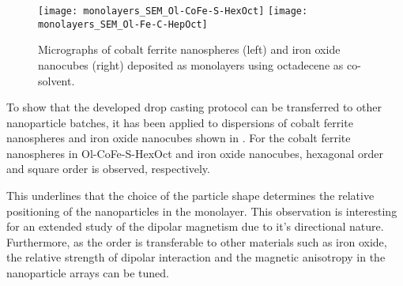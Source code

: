 \documentclass[\main/dresen_thesis.tex]{subfiles}
\begin{document}
  \label{sec:monolayers:preparation:nanoparticleVariation}
    \begin{figure}[tb]
      \centering
      \texttt{[image: monolayers\_SEM\_Ol-CoFe-S-HexOct]}
      \texttt{[image: monolayers\_SEM\_Ol-Fe-C-HepOct]}
      \caption{\label{fig:monolayers:preparation:nanoparticleVariation:spheresIron}Micrographs of cobalt ferrite nanospheres (left) and iron oxide nanocubes (right) deposited as monolayers using octadecene as co-solvent.}
    \end{figure}

    To show that the developed drop casting protocol can be transferred to other nanoparticle batches, it has been applied to dispersions of cobalt ferrite nanospheres and iron oxide nanocubes shown in .
    For the cobalt ferrite nanospheres in Ol-CoFe-S-HexOct and iron oxide nanocubes, hexagonal order and square order is observed, respectively.

    This underlines that the choice of the particle shape determines the relative positioning of the nanoparticles in the monolayer.
    This observation is interesting for an extended study of the dipolar magnetism due to it's directional nature.
    Furthermore, as the order is transferable to other materials such as iron oxide, the relative strength of dipolar interaction and the magnetic anisotropy in the nanoparticle arrays can be tuned.
\end{document}
